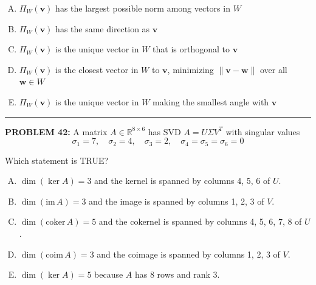 \documentclass[12pt]{amsart}
\newcommand{\divider}{
  \vspace{-1em} %
  \noindent
  \raisebox{-0.15ex}{\textbullet}%
  \hspace{0.5em}%
  \rule[0.5ex]{0.95\textwidth}{1.0pt}%
  \hspace{0.5em}%
  \raisebox{-0.15ex}{\textbullet}%
  \vspace{0em} %
}
\begin{document}
{\begin{enumerate}[(A)]
\item $\Pi_W(\mathbf{v})$ has the largest possible norm among vectors in $W$
\item $\Pi_W(\mathbf{v})$ has the same direction as $\mathbf{v}$
\item $\Pi_W(\mathbf{v})$ is the unique vector in $W$ that is orthogonal to $\mathbf{v}$
\item $\Pi_W(\mathbf{v})$ is the closest vector in $W$ to $\mathbf{v}$, minimizing $\|\mathbf{v} - \mathbf{w}\|$ over all $\mathbf{w} \in W$
\item $\Pi_W(\mathbf{v})$ is the unique vector in $W$ making the smallest angle with $\mathbf{v}$
\end{enumerate}


\divider


{\bf PROBLEM 42:}
% 
A matrix $A \in \mathbb{R}^{8 \times 6}$ has SVD $A = U\Sigma V^T$ with singular values
$$\sigma_1 = 7, \quad \sigma_2 = 4, \quad \sigma_3 = 2, \quad \sigma_4 = \sigma_5 = \sigma_6 = 0$$

Which statement is TRUE?

\begin{enumerate}[(A)]
\item $\dim(\ker A) = 3$ and the kernel is spanned by columns 4, 5, 6 of $U$.
\item $\dim(\mathrm{im}\, A) = 3$ and the image is spanned by columns 1, 2, 3 of $V$.
\item $\dim(\mathrm{coker}\, A) = 5$ and the cokernel is spanned by columns 4, 5, 6, 7, 8 of $U$.
\item $\dim(\mathrm{coim}\, A) = 3$ and the coimage is spanned by columns 1, 2, 3 of $V$.
\item $\dim(\ker A) = 5$ because $A$ has 8 rows and rank 3.
\end{enumerate}

}
\end{document}

